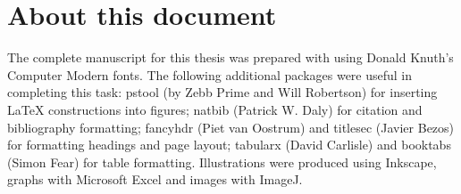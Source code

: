 \section*{About this document}\thispagestyle{plain}

The complete manuscript for this thesis was prepared with {\LaTeXe} using Donald Knuth's Computer Modern fonts. The following additional packages were useful in completing this task: {\sffamily pstool} (by Zebb Prime and Will Robertson) for inserting {\LaTeX} constructions into figures; {\sffamily natbib} (Patrick W. Daly) for citation and bibliography formatting; {\sffamily fancyhdr} (Piet van Oostrum) and {\sffamily titlesec} (Javier Bezos) for formatting headings and page layout; {\sffamily tabularx} (David Carlisle) and {\sffamily booktabs} (Simon Fear) for table formatting. Illustrations were produced using Inkscape, graphs with Microsoft Excel and images with ImageJ.